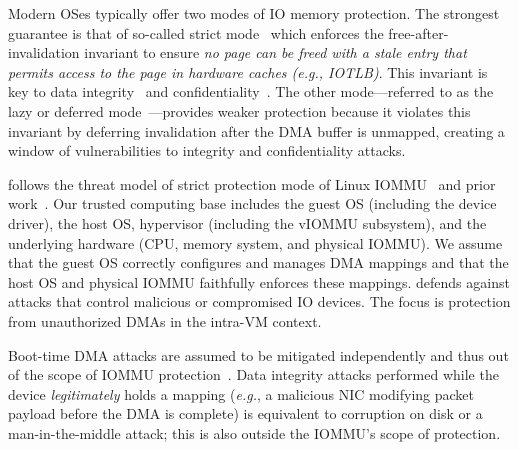 Modern OSes typically offer two modes of IO memory protection. 
The strongest guarantee is that of so-called strict mode~\cite{nadav2010iommu, Amit2011vIOMMU} 
    which enforces  
    the free-after-invalidation invariant to ensure %
    \emph{no page can be freed with a stale entry 
        that permits access to the page in hardware caches (\textit{e.g.}, IOTLB)}.
This invariant is key to data integrity~\cite{AlexCodeInjection} and confidentiality~\cite{RajapakshaIOMMU}.
The other mode---referred to as the lazy or deferred mode~\cite{RajapakshaIOMMU,AlexCodeInjection}---provides 
    weaker protection because it violates this invariant by
    deferring invalidation after the DMA 
    buffer is unmapped, creating a window of vulnerabilities to integrity and confidentiality attacks.

{\name} follows the threat model of strict protection mode of Linux IOMMU~\cite{nadav2010iommu} and prior work~\cite{markuze2018damn,Amit2011vIOMMU,RajapakshaIOMMU}.
Our trusted computing base includes the guest OS (including the device driver), 
    the host OS, hypervisor (including the vIOMMU subsystem), 
    and the underlying hardware (CPU, memory system, and physical IOMMU).
We assume that the guest OS correctly configures and manages DMA mappings
    and that the host OS and physical IOMMU faithfully enforces these mappings.
{\name} defends against attacks that control malicious or compromised IO devices.
The focus is protection from unauthorized DMAs in the intra-VM context.


Boot-time DMA attacks are assumed to be mitigated independently and 
    thus out of the scope of IOMMU protection~\cite{markuze2018damn}.
Data integrity attacks performed while the device \emph{legitimately} 
    holds a mapping (\textit{e.g.}, a malicious NIC modifying packet payload before the DMA is complete) 
    is equivalent to corruption on disk or a man-in-the-middle attack; 
    this is also outside the IOMMU's scope of protection.

